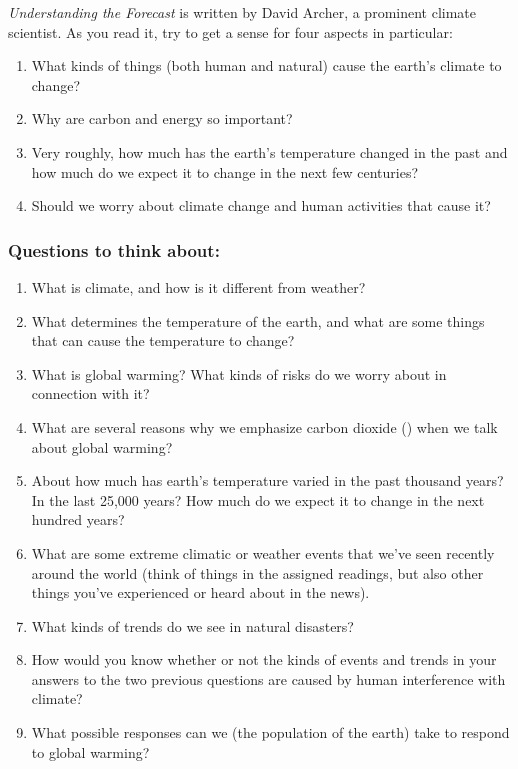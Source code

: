 \documentclass[
]{article}
\providecommand{\tightlist}{%
  \setlength{\itemsep}{0pt}\setlength{\parskip}{0pt}}
\newcommand{\COO}{\ce{CO2}}
\begin{document}
\emph{Understanding the Forecast} is written by David Archer, a
prominent climate scientist. As you read it, try to get a sense for four
aspects in particular:

\begin{enumerate}
\def\labelenumi{\arabic{enumi}.}
\tightlist
\item
  What kinds of things (both human and natural) cause the earth's
  climate to change?
\item
  Why are carbon and energy so important?
\item
  Very roughly, how much has the earth's temperature changed in the past
  and how much do we expect it to change in the next few centuries?
\item
  Should we worry about climate change and human activities that cause
  it?
\end{enumerate}

\hypertarget{questions-to-think-about}{%
\subsubsection{Questions to think
about:}\label{questions-to-think-about}}

\begin{enumerate}
\def\labelenumi{\arabic{enumi}.}
\tightlist
\item
  What is climate, and how is it different from weather?
\item
  What determines the temperature of the earth, and what are some things
  that can cause the temperature to change?
\item
  What is global warming? What kinds of risks do we worry about in
  connection with it?
\item
  What are several reasons why we emphasize carbon dioxide (\COO) when
  we talk about global warming?
\item
  About how much has earth's temperature varied in the past thousand
  years? In the last 25,000 years? How much do we expect it to change in
  the next hundred years?
\item
  What are some extreme climatic or weather events that we've seen
  recently around the world (think of things in the assigned readings,
  but also other things you've experienced or heard about in the news).
\item
  What kinds of trends do we see in natural disasters?
\item
  How would you know whether or not the kinds of events and trends in
  your answers to the two previous questions are caused by human
  interference with climate?
\item
  What possible responses can we (the population of the earth) take to
  respond to global warming?
\end{enumerate}
\end{document}
